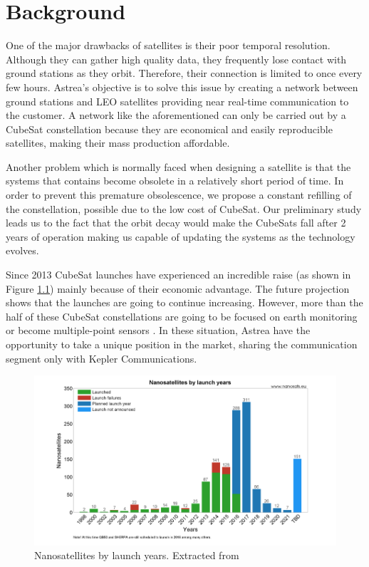 \chapter{Background}
One of the major drawbacks of satellites is their poor temporal resolution. Although they can gather high quality data, they frequently lose contact with ground stations as they orbit. Therefore, their connection is limited to once every few hours. Astrea’s objective is to solve this issue by creating a network between ground stations and LEO satellites providing near real-time communication to the customer. A network like the aforementioned can only be carried out by a CubeSat constellation because they are economical and easily reproducible satellites, making their mass production affordable.

Another problem which is normally faced when designing a satellite is that the systems that contains become obsolete in a relatively short period of time. In order to prevent this premature obsolescence, we propose a constant refilling of the constellation, possible due to the low cost of CubeSat. Our preliminary study leads us to the fact that the orbit decay would make the CubeSats fall after 2 years of operation making us capable of updating the systems as the technology evolves.

Since 2013 CubeSat launches have experienced an incredible raise (as shown in Figure \ref{launches}) mainly because of their economic advantage. The future projection shows that the launches are going to continue increasing. However, more than the half of these CubeSat constellations are going to be focused on earth monitoring or become multiple-point sensors \cite{SpaceWorks}. In these situation, Astrea have the opportunity to take a unique position in the market, sharing the communication segment only with Kepler Communications\cite{keppler}.

\begin{figure}[H]
\centering
\includegraphics[scale=0.4]{img/launches.png}
\caption[Nanosatellites by launch years]{Nanosatellites by launch years. Extracted from \cite{nanosats}}
\label{launches}
\end{figure}

